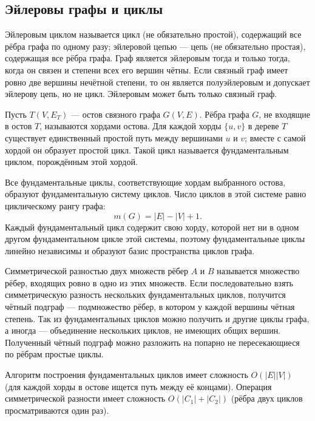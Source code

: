 \documentclass[14pt,a4paper]{extarticle}
\begin{document}
\subsection{Эйлеровы графы и циклы}

Эйлеровым циклом называется цикл (не обязательно простой), содержащий все рёбра графа по одному разу; эйлеровой цепью --- цепь (не обязательно простая), содержащая все рёбра графа. Граф является эйлеровым тогда и только тогда, когда он связен и степени всех его вершин чётны. Если связный граф имеет ровно две вершины нечётной степени, то он является полуэйлеровым и допускает эйлерову цепь, но не цикл. Эйлеровым может быть только связный граф.

Пусть \(T(V,E_T)\) --- остов связного графа \(G(V,E)\). Рёбра графа \(G\), не входящие в остов \(T\), называются хордами остова. Для каждой хорды \(\{u,v\}\) в дереве \(T\) существует единственный простой путь между вершинами \(u\) и \(v\); вместе с самой хордой он образует простой цикл. Такой цикл называется фундаментальным циклом, порождённым этой хордой.

Все фундаментальные циклы, соответствующие хордам выбранного остова, образуют фундаментальную систему циклов. Число циклов в этой системе равно циклическому рангу графа:
\[
m(G)=|E|-|V|+1.
\]
Каждый фундаментальный цикл содержит свою хорду, которой нет ни в одном другом фундаментальном цикле этой системы, поэтому фундаментальные циклы линейно независимы и образуют базис пространства циклов графа.

Симметрической разностью двух множеств рёбер \(A\) и \(B\) называется множество рёбер, входящих ровно в одно из этих множеств. Если последовательно взять симметрическую разность нескольких фундаментальных циклов, получится чётный подграф --- подмножество рёбер, в котором у каждой вершины чётная степень. Так из фундаментальных циклов можно получить и другие циклы графа, а иногда --- объединение нескольких циклов, не имеющих общих вершин. Полученный чётный подграф можно разложить на попарно не пересекающиеся по рёбрам простые циклы.

Алгоритм построения фундаментальных циклов имеет сложность \(O(|E||V|)\) (для каждой хорды в остове ищется путь между её концами). Операция симметрической разности имеет сложность \(O(|C_1|+|C_2|)\) (рёбра двух циклов просматриваются один раз).
\end{document}
